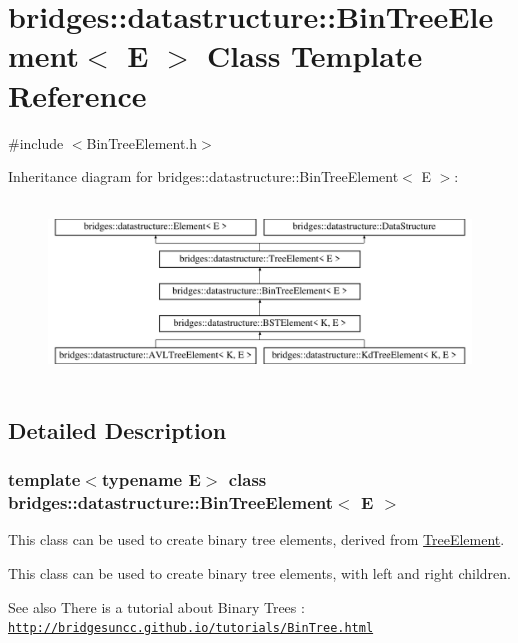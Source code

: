 \hypertarget{classbridges_1_1datastructure_1_1_bin_tree_element}{}\section{bridges\+:\+:datastructure\+:\+:Bin\+Tree\+Element$<$ E $>$ Class Template Reference}
\label{classbridges_1_1datastructure_1_1_bin_tree_element}


{\ttfamily \#include $<$Bin\+Tree\+Element.\+h$>$}

Inheritance diagram for bridges\+:\+:datastructure\+:\+:Bin\+Tree\+Element$<$ E $>$\+:\begin{figure}[H]
\begin{center}
\leavevmode
\includegraphics[height=4.794520cm]{classbridges_1_1datastructure_1_1_bin_tree_element}
\end{center}
\end{figure}


\subsection{Detailed Description}
\subsubsection*{template$<$typename E$>$\newline
class bridges\+::datastructure\+::\+Bin\+Tree\+Element$<$ E $>$}

This class can be used to create binary tree elements, derived from \mbox{\hyperlink{classbridges_1_1datastructure_1_1_tree_element}{Tree\+Element}}. 

This class can be used to create binary tree elements, with left and right children.

\begin{DoxySeeAlso}{See also}
There is a tutorial about Binary Trees \+: \href{http://bridgesuncc.github.io/tutorials/BinTree.html}{\tt http\+://bridgesuncc.\+github.\+io/tutorials/\+Bin\+Tree.\+html}
\end{DoxySeeAlso}

